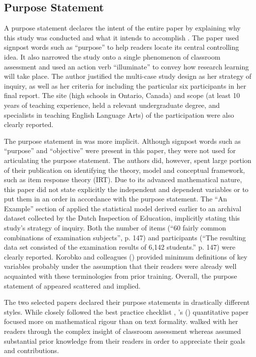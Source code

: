 \documentclass[
    a4paper,            %
    12pt,               %
    stu,                %
    noextraspace,       %
    floatsintext,       %
    biblatex,           %
    colorlinks=true,        %
    linkcolor=red,          %
    anchorcolor=black,      %
    citecolor=blue,         %
    urlcolor=blue,          %
    bookmarks=true,         %
    bookmarksopen=false,    %
    bookmarksnumbered=true  %
    margin=2cm              %
]{apa7}
\newcommand{\poscite}[1]{\citeauthor{#1}'s (\citeyear{#1})}
\begin{document}
\subsection{Purpose Statement}

A purpose statement declares the intent of the entire paper by explaining why this study was conducted and what it intends to accomplish \parencite{creswell:2018}. The \textcite{tierney:2014} paper used signpost words such as ``purpose'' to help readers locate its central controlling idea. It also narrowed the study onto a single phenomenon of classroom assessment and used an action verb ``illuminate'' to convey how research learning will take place. The author justified the multi-case study design as her strategy of inquiry, as well as her criteria for including the particular six participants in her final report. The site (high schools in Ontario, Canada) and scope (at least 10 years of teaching experience, held a relevant undergraduate degree, and specialists in teaching English Language Arts) of the participation were also clearly reported.

The purpose statement in \textcite{korobko:2008} was more implicit. Although signpost words such as ``purpose'' and ``objective'' were present in this paper, they were not used for articulating the purpose statement. The authors did, however, spent large portion of their publication on identifying the theory, model and conceptual framework, such as item response theory (IRT). Due to its advanced mathematical nature, this paper did not state explicitly the independent and dependent variables or to put them in an order in accordance with the purpose statement. The ``An Example'' section of \textcite[][pp. 147--153]{korobko:2008} applied the statistical model derived earlier to an archival dataset collected by the Dutch Inspection of Education, implicitly stating this study's strategy of inquiry. Both the number of items (``60 fairly common combinations of examination subjects'', p. 147) and participants (``The resulting data set consisted of the examination results of 6,142 students.'' p. 147) were clearly reported. Korobko and colleagues (\citeyear{korobko:2008}) provided minimum definitions of key variables probably under the assumption that their readers were already well acquainted with these terminologies from prior training. Overall, the purpose statement of \textcite{korobko:2008} appeared scattered and implied.

The two selected papers declared their purpose statements in drastically different styles. While \textcite{tierney:2014} closely followed the best practice checklist \parencite{creswell:2018}, \poscite{korobko:2008} quantitative paper focused more on mathematical rigour than on text formality. \textcite{tierney:2014} walked with her readers through the complex insight of classroom assessment whereas \textcite{korobko:2008} assumed substantial prior knowledge from their readers in order to appreciate their goals and contributions.
\end{document}
